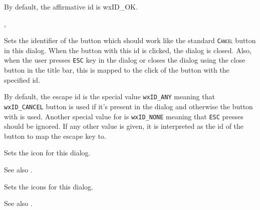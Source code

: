 By default, the affirmative id is wxID\_OK.


, 


\label{wxdialogsetescapeid}


Sets the identifier of the button which should work like the standard 
\texttt{\textsc{Cancel}} button in this dialog. When the button with this id is
clicked, the dialog is closed. Also, when the user presses \texttt{\textsc{ESC}} 
key in the dialog or closes the dialog using the close button in the title bar,
this is mapped to the click of the button with the specified id.

By default, the escape id is the special value \texttt{wxID\_ANY} meaning that 
\texttt{wxID\_CANCEL} button is used if it's present in the dialog and
otherwise the button with  
is used. Another special value for  is \texttt{wxID\_NONE} meaning that
\texttt{\textsc{ESC}} presses should be ignored. If any other value is given, it
is interpreted as the id of the button to map the escape key to.


\label{wxdialogseticon}


Sets the icon for this dialog.



See also .


\label{wxdialogseticons}


Sets the icons for this dialog.



See also .


\label{wxdialogsetlayoutadaptationdone}



